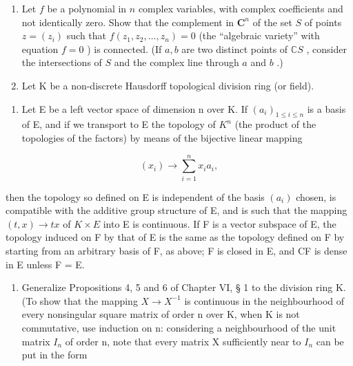 \ExerciseSection

\begin{enumerate}
\def\labelenumi{\arabic{enumi})}
\item
  Let \(f\) be a polynomial in \(n\) complex variables, with complex coefficients and not identically zero. Show that the complement in \(\mathbf{C}^n\) of the set \(S\) of points \(z = (z_i)\) such that \(f(z_1, z_2, \ldots, z_n) = 0\) (the ``algebraic variety'' with equation \(f = 0\) ) is connected. (If \(a, b\) are two distinct points of \(\mathbb{C}S\) , consider the intersections of \(S\) and the complex line through \(a\) and \(b\) .)
\item
  Let K be a non-discrete Hausdorff topological division ring (or field).
\end{enumerate}

\begin{enumerate}
\def\labelenumi{\alph{enumi})}
\tightlist
\item
  Let E be a left vector space of dimension n over K. If \((a_{i})_{1\leqslant i\leqslant n}\) is a basis of E, and if we transport to E the topology of \(K^{n}\) (the product of the topologies of the factors) by means of the bijective linear mapping
\end{enumerate}

\[
(x _ {i}) \rightarrow \sum_ {i = 1} ^ {n} x _ {i} a _ {i},
\]

then the topology so defined on E is independent of the basis \((a_{i})\) chosen, is compatible with the additive group structure of E, and is such that the mapping \((t, x) \to tx\) of \(K \times E\) into E is continuous. If F is a vector subspace of E, the topology induced on F by that of E is the same as the topology defined on F by starting from an arbitrary basis of F, as above; F is closed in E, and CF is dense in E unless F = E.

\begin{enumerate}
\def\labelenumi{\alph{enumi})}
\setcounter{enumi}{1}
\tightlist
\item
  Generalize Propositions 4, 5 and 6 of Chapter VI, § 1 to the division ring K. (To show that the mapping \(X \to X^{-1}\) is continuous in the neighbourhood of every nonsingular square matrix of order n over K, when K is not commutative, use induction on n: considering a neighbourhood of the unit matrix \(I_{n}\) of order n, note that every matrix X sufficiently near to \(I_{n}\) can be put in the form
\end{enumerate}

